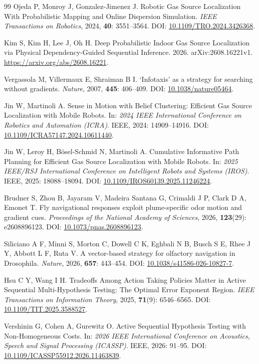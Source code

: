 \begin{thebibliography}{99}
Ojeda P, Monroy J, Gonzalez-Jimenez J. Robotic Gas Source Localization With Probabilistic Mapping and Online Dispersion Simulation. {\sl IEEE Transactions on Robotics}, 2024, {\bf 40}: 3551--3564. DOI: \url{10.1109/TRO.2024.3426368}.

Kim S, Kim H, Lee J, Oh H. Deep Probabilistic Indoor Gas Source Localization via Physical Dependency-Guided Sequential Inference. 2026. arXiv:2608.16221v1. \url{https://arxiv.org/abs/2608.16221}.

Vergassola M, Villermaux E, Shraiman B I. `Infotaxis' as a strategy for searching without gradients. {\sl Nature}, 2007, {\bf 445}: 406--409. DOI: \url{10.1038/nature05464}.

Jin W, Martinoli A. Sense in Motion with Belief Clustering: Efficient Gas Source Localization with Mobile Robots. In: {\sl 2024 IEEE International Conference on Robotics and Automation (ICRA)}. IEEE, 2024: 14909--14916. DOI: \url{10.1109/ICRA57147.2024.10611440}.

Jin W, Leroy H, B{\"o}sel-Schmid N, Martinoli A. Cumulative Informative Path Planning for Efficient Gas Source Localization with Mobile Robots. In: {\sl 2025 IEEE/RSJ International Conference on Intelligent Robots and Systems (IROS)}. IEEE, 2025: 18088--18094. DOI: \url{10.1109/IROS60139.2025.11246224}.

Brudner S, Zhou B, Jayaram V, {Madeira Santana} G, Crimaldi J P, Clark D A, Emonet T. Fly navigational responses exploit plume-specific odor motion and gradient cues. {\sl Proceedings of the National Academy of Sciences}, 2026, {\bf 123}(29): e2608896123. DOI: \url{10.1073/pnas.2608896123}.

Siliciano A F, Minni S, Morton C, Dowell C K, Eghbali N B, Busch S E, Rhee J Y, Abbott L F, Ruta V. A vector-based strategy for olfactory navigation in {Drosophila}. {\sl Nature}, 2026, {\bf 657}: 443--454. DOI: \url{10.1038/s41586-026-10827-7}.

Hsu C Y, Wang I H. Tradeoffs Among Action Taking Policies Matter in Active Sequential Multi-Hypothesis Testing: The Optimal Error Exponent Region. {\sl IEEE Transactions on Information Theory}, 2025, {\bf 71}(9): 6546--6565. DOI: \url{10.1109/TIT.2025.3588527}.

Vershinin G, Cohen A, Gurewitz O. Active Sequential Hypothesis Testing with Non-Homogeneous Costs. In: {\sl 2026 IEEE International Conference on Acoustics, Speech and Signal Processing (ICASSP)}. IEEE, 2026: 91--95. DOI: \url{10.1109/ICASSP55912.2026.11463839}.


\end{thebibliography}
